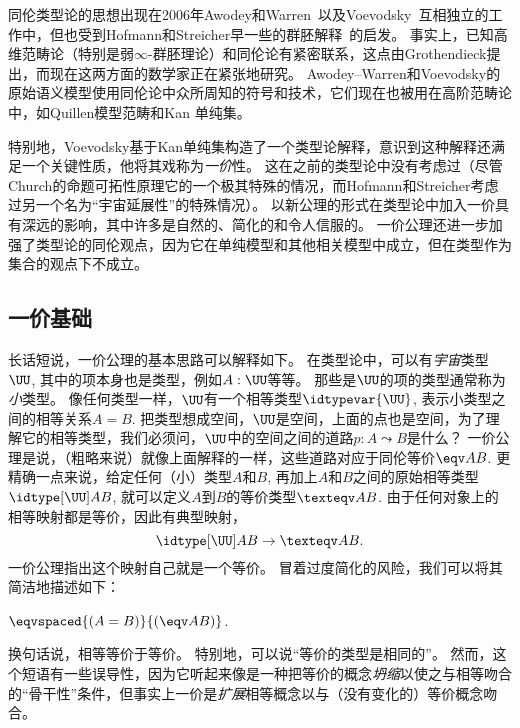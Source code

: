 同伦类型论的思想出现在2006年Awodey和Warren~\cite{AW}以及Voevodsky~\cite{VV}互相独立的工作中，但也受到Hofmann和Streicher早一些的群胚解释~\cite{hs:gpd-typethy}的启发。
事实上，已知高维范畴论（特别是弱$\infty$-群胚理论）和同伦论有紧密联系，这点由Grothendieck提出，而现在这两方面的数学家正在紧张地研究。
Awodey--Warren和Voevodsky的原始语义模型使用同伦论中众所周知的符号和技术，它们现在也被用在高阶范畴论中，如Quillen模型范畴和Kan 单纯集。
%
%

特别地，Voevodsky基于Kan单纯集构造了一个类型论解释，意识到这种解释还满足一个关键性质，他将其戏称为\emph{一价}性。
这在之前的类型论中没有考虑过（尽管Church的命题可拓性原理它的一个极其特殊的情况，而Hofmann和Streicher考虑过另一个名为“宇宙延展性”的特殊情况）。
以新公理的形式在类型论中加入一价具有深远的影响，其中许多是自然的、简化的和令人信服的。
一价公理还进一步加强了类型论的同伦观点，因为它在单纯模型和其他相关模型中成立，但在类型作为集合的观点下不成立。

\subsection*{一价基础}

长话短说，一价公理的基本思路可以解释如下。
在类型论中，可以有\emph{宇宙}类型$\UU$, 其中的项本身也是类型，例如$A : \UU$等等。
那些是$\UU$的项的类型通常称为\emph{小}类型。
%
%
像任何类型一样，$\UU$有一个相等类型$\idtypevar{\UU}$, 表示小类型之间的相等关系$A = B$.
把类型想成空间，$\UU$是空间，上面的点也是空间，为了理解它的相等类型，我们必须问，$\UU$中的空间之间的道路$p : A \leadsto B$是什么？
一价公理是说，（粗略来说）就像上面解释的一样，这些道路对应于同伦等价$\eqv A B$.
更精确一点来说，给定任何（小）类型$A$和$B$, 再加上$A$和$B$之间的原始相等类型$\idtype[\UU]AB$, 就可以定义$A$到$B$的等价类型$\texteqv AB$.
由于任何对象上的相等映射都是等价，因此有典型映射，
\[\idtype[\UU]AB\to\texteqv AB.\]
一价公理指出这个映射自己就是一个等价。
冒着过度简化的风险，我们可以将其简洁地描述如下：

\begin{description}%
\item[一价公理：]  $\eqvspaced{(A = B)}{(\eqv A B)}$.
\end{description}
%
换句话说，相等等价于等价。
% 
特别地，可以说“等价的类型是相同的”。
然而，这个短语有一些误导性，因为它听起来像是一种把等价的概念\emph{坍缩}以使之与相等吻合的“骨干性”条件，但事实上一价是\emph{扩展}相等概念以与（没有变化的）等价概念吻合。

